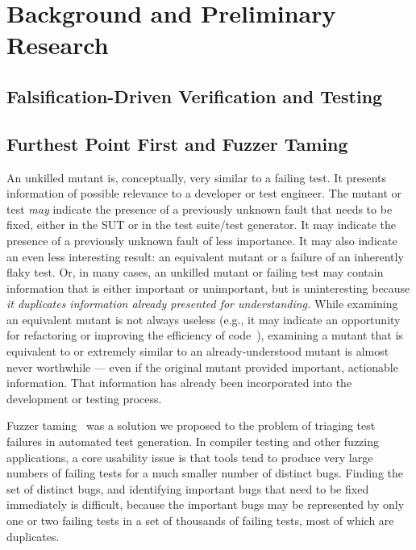 \section{Background and Preliminary Research}

\subsection{Falsification-Driven Verification and Testing}

\subsection{Furthest Point First and Fuzzer Taming}

An unkilled mutant is, conceptually, very similar to a failing test.
It presents information of possible relevance to a developer or test
engineer.  The mutant or test \emph{may} indicate the presence of a
previously unknown fault that needs to be fixed, either in the SUT or in the test suite/test
generator.  It may indicate the presence of a previously unknown fault
of less importance.  It may also indicate an even less interesting
result:  an equivalent mutant or 
a failure of an inherently flaky test.  Or, in many cases, an unkilled
mutant or failing test may contain information that is either
important or unimportant, but is uninteresting because \emph{it
  duplicates information already presented for understanding.}  While
examining an equivalent mutant is not always useless (e.g., it may indicate
an opportunity for refactoring or improving the efficiency of code~\cite{ivankovic2018industrial,groce2018verified}), examining a mutant that is
equivalent to or extremely similar to an already-understood mutant is almost never
worthwhile --- even if the original mutant provided important,
actionable information.  That information has already been
incorporated into the development or testing process.

Fuzzer taming~\cite{PLDI13} was a solution we proposed to the problem
of triaging test failures in automated test generation.  In compiler
testing and other fuzzing applications, a core usability issue is that
tools tend to produce very large numbers of failing tests for a much
smaller number of distinct bugs.  Finding the set of distinct bugs,
and identifying important bugs that need to be fixed immediately is
difficult, because the important bugs may be represented by only one
or two failing tests in a set of thousands of failing tests, most of
which are duplicates.